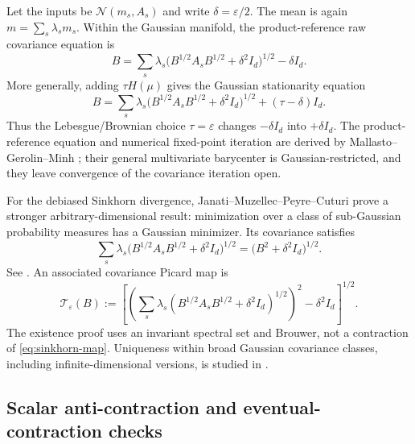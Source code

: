 \documentclass[11pt]{article}
\theoremstyle{definition}
\newcommand{\Id}{I_d}
\newcommand{\cN}{\mathcal N}
\newcommand{\cT}{\mathcal T}
\newcommand{\eps}{\varepsilon}
\begin{document}
Let the inputs be $\cN(m_s,A_s)$ and write $\delta=\eps/2$.  The mean is again
$m=\sum_s\lambda_sm_s$.  Within the Gaussian manifold, the product-reference
raw covariance equation is
\begin{equation}\label{eq:entropic-product}
 B=\sum_s\lambda_s
 \bigl(B^{1/2}A_sB^{1/2}+\delta^2\Id\bigr)^{1/2}-\delta\Id.
\end{equation}
More generally, adding $\tau H(\mu)$ gives the Gaussian stationarity equation
\begin{equation}\label{eq:doubly-regularized}
 B=\sum_s\lambda_s
 \bigl(B^{1/2}A_sB^{1/2}+\delta^2\Id\bigr)^{1/2}
 +(\tau-\delta)\Id.
\end{equation}
Thus the Lebesgue/Brownian choice $\tau=\eps$ changes $-\delta\Id$ into
$+\delta\Id$.  The product-reference equation and numerical fixed-point
iteration are derived by Mallasto--Gerolin--Minh
\cite{MallastoGerolinMinh2022}; their general multivariate barycenter is
Gaussian-restricted, and they leave convergence of the covariance iteration
open.

For the debiased Sinkhorn divergence, Janati--Muzellec--Peyre--Cuturi prove a
stronger arbitrary-dimensional result: minimization over a class of
sub-Gaussian probability measures has a Gaussian minimizer.  Its covariance
satisfies
\begin{equation}\label{eq:sinkhorn-covariance}
 \sum_s\lambda_s
 \bigl(B^{1/2}A_sB^{1/2}+\delta^2\Id\bigr)^{1/2}
 =\bigl(B^2+\delta^2\Id\bigr)^{1/2}.
\end{equation}
See \cite[Theorem 2]{JanatiEtAl2020UnbalancedGaussian}.  An associated
covariance Picard map is
\begin{equation}\label{eq:sinkhorn-map}
 \cT_\eps(B):=
 \left[
 \left(\sum_s\lambda_s
 (B^{1/2}A_sB^{1/2}+\delta^2\Id)^{1/2}\right)^2
 -\delta^2\Id
 \right]^{1/2}.
\end{equation}
The existence proof uses an invariant spectral set and Brouwer, not a
contraction of \eqref{eq:sinkhorn-map}.  Uniqueness within broad Gaussian
covariance classes, including infinite-dimensional versions, is studied in
\cite{Minh2023}.

\subsection{Scalar anti-contraction and eventual-contraction checks}
\end{document}
